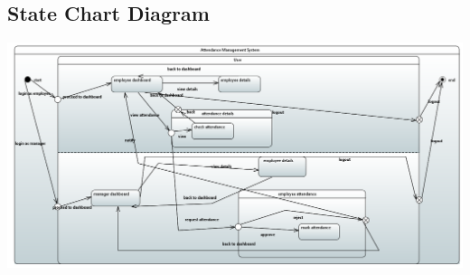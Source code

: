 \documentclass[a4paper, 12pt]{article}
\begin{document}
\subsection{State Chart Diagram}
\begin{center}
\includegraphics[width=1\textwidth]{Attendance_Management_System_State_Chart.PNG}\par
\end{center}
\end{document}

